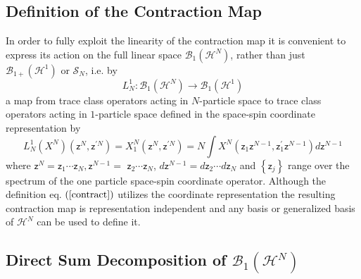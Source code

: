\documentclass[aps,preprint]{revtex4}%
\begin{document}
\subsection{Definition of the Contraction Map}

In order to fully exploit the linearity of the contraction map it is
convenient to express its action on the full linear space $\mathcal{B}%
_{1}\left(  \mathcal{H}^{N}\right)  $, rather than just $\mathcal{B}%
_{1+}\left(  \mathcal{H}^{1}\right)  $ or $\mathcal{S}_{N}$, i.e. by
\begin{equation}
L_{N}^{1}:\mathcal{B}_{1}\left(  \mathcal{H}^{N}\right)  \rightarrow
\mathcal{B}_{1}\left(  \mathcal{H}^{1}\right)
\end{equation}
a map from trace class operators acting in $N$-particle space to trace class
operators acting in $1$-particle space defined in the space-spin coordinate
representation by
\begin{equation}
L_{N}^{1}\left(  X^{N}\right)  \left(  \mathsf{z}^{N},\mathsf{z}^{\prime
N}\right)  =X_{1}^{N}\left(  \mathsf{z}^{N},\mathsf{z}^{\prime N}\right)
=N\int X^{N}\left(  \mathsf{z}_{1}\mathsf{z}^{N-1},\mathsf{z}_{1}^{\prime
}\mathsf{z}^{N-1}\right)  d\mathsf{z}^{N-1} \label{contract}%
\end{equation}
where $\mathsf{z}^{N}=\mathsf{z}_{1}\cdots\mathsf{z}_{N},\mathsf{z}^{N-1}=$
$\mathsf{z}_{2}\cdots\mathsf{z}_{N}$, $d\mathsf{z}^{N-1}=d\mathsf{z}_{2}\cdots
d\mathsf{z}_{N}$ and $\left\{  \mathsf{z}_{j}\right\}  $ range over the
spectrum of the one particle space-spin coordinate operator. Although the
definition eq. $\left(  \ref{contract}\right)  $ utilizes the coordinate
representation the resulting contraction map is representation independent and
any basis or generalized basis of $\mathcal{H}^{N}$ \cite{Berezin1991} can be
used to define it.

\subsection{Direct Sum Decomposition of $\mathcal{B}_{1}\left(  \mathcal{H}%
^{N}\right)  \label{DirectSum}$}
\end{document}
